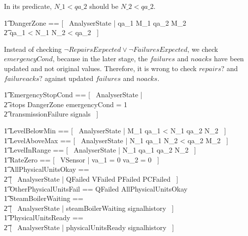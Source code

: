 \documentclass{report} %
\begin{document}
In its predicate, $N\_1 < qa\_2$ should be $N\_2 < qa\_2$.
\begin{zed}
    \t1 DangerZone == [~ AnalyserState | qa\_1 \geq M\_1 \land qa\_2 \leq M\_2 \\
        \t2 \implies qa\_1 < N\_1 \land N\_2 < qa\_2 ~] \\ %
\end{zed}
Instead of checking $\lnot RepairsExpected \lor \lnot FailuresExpected$, we check $emergencyCond$, because in the later stage, the $failures$ and $noacks$ have been updated and not original values. Therefore, it is wrong to check $repairs?$ and $failureacks?$ against updated $failures$ and $noacks$.
\begin{zed}
    \t1 EmergencyStopCond ==  [~ AnalyserState | \\
            \t2 stops  \lor DangerZone \lor emergencyCond = 1 \lor \\
            \t2 transmissionFailure \in signals ~] \\
\end{zed}
\begin{zed}
    \t1 LevelBelowMin == [~ AnalyserState | M\_1 \leq qa\_1 < N\_1 \land qa\_2 \leq N\_2 ~] \\
    \t1 LevelAboveMax == [~ AnalyserState | N\_1 \leq qa\_1 \land N\_2 < qa\_2 \leq M\_2 ~] \\
    \t1 LevelInRange == [~ AnalyserState | N\_1 \leq qa\_1 \land qa\_2 \leq N\_2 ~] \\
    \t1 RateZero == [~ VSensor | va\_1 = 0 \land va\_2 = 0 ~] \\
    \t1 AllPhysicalUnitsOkay == \\
        \t2 [~ AnalyserState | \lnot QFailed \land \lnot VFailed \land \lnot PFailed \land \lnot PCFailed ~] \\
    \t1 OtherPhysicalUnitsFail == \lnot QFailed \land \lnot AllPhysicalUnitsOkay \\
    \t1 SteamBoilerWaiting == \\
        \t2 [~ AnalyserState | steamBoilerWaiting \in signalhistory ~] \\
    \t1 PhysicalUnitsReady == \\
        \t2 [~ AnalyserState | physicalUnitsReady \in signalhistory ~] \\
\end{zed}
\end{document}
